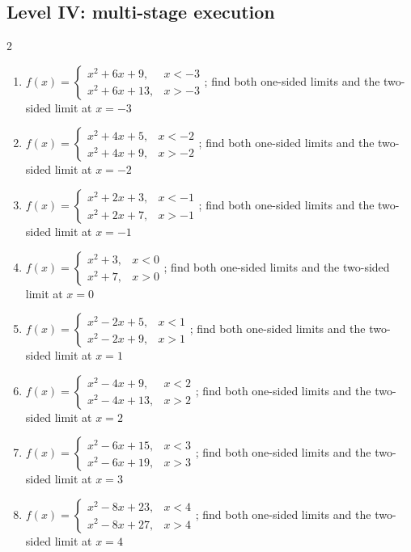 \documentclass[11pt,oneside]{book}
\begin{document}
\subsection*{Level IV: multi-stage execution}
\begin{multicols}{2}
\begin{enumerate}[leftmargin=*,label=\textbf{\arabic*.},itemsep=0.65\baselineskip]
\item $f(x)=\begin{cases} x^{2} + 6 x + 9, & x<-3\\ x^{2} + 6 x + 13, & x>-3 \end{cases}$; find both one-sided limits and the two-sided limit at $x=-3$
\item $f(x)=\begin{cases} x^{2} + 4 x + 5, & x<-2\\ x^{2} + 4 x + 9, & x>-2 \end{cases}$; find both one-sided limits and the two-sided limit at $x=-2$
\item $f(x)=\begin{cases} x^{2} + 2 x + 3, & x<-1\\ x^{2} + 2 x + 7, & x>-1 \end{cases}$; find both one-sided limits and the two-sided limit at $x=-1$
\item $f(x)=\begin{cases} x^{2} + 3, & x<0\\ x^{2} + 7, & x>0 \end{cases}$; find both one-sided limits and the two-sided limit at $x=0$
\item $f(x)=\begin{cases} x^{2} - 2 x + 5, & x<1\\ x^{2} - 2 x + 9, & x>1 \end{cases}$; find both one-sided limits and the two-sided limit at $x=1$
\item $f(x)=\begin{cases} x^{2} - 4 x + 9, & x<2\\ x^{2} - 4 x + 13, & x>2 \end{cases}$; find both one-sided limits and the two-sided limit at $x=2$
\item $f(x)=\begin{cases} x^{2} - 6 x + 15, & x<3\\ x^{2} - 6 x + 19, & x>3 \end{cases}$; find both one-sided limits and the two-sided limit at $x=3$
\item $f(x)=\begin{cases} x^{2} - 8 x + 23, & x<4\\ x^{2} - 8 x + 27, & x>4 \end{cases}$; find both one-sided limits and the two-sided limit at $x=4$

\end{enumerate}
\end{multicols}
\end{document}
